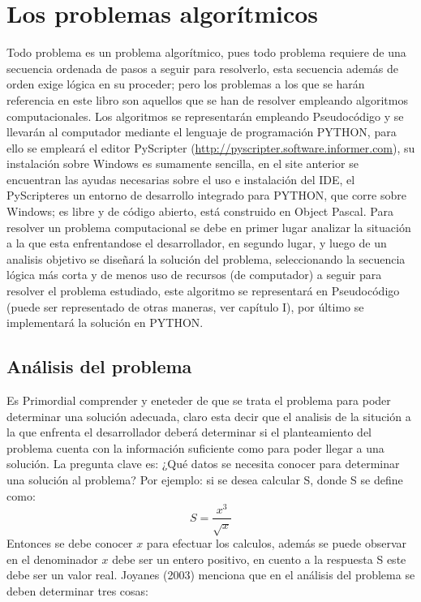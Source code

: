 \documentclass[12pt, a4paper]{article}
\title{\textbf{
	\begin{flushright}
		Capítulo II
	\end{flushright}
	ALGORITMOS Y PROGRMAS ELEMENTALES
	}}
\date{\today}
\author{Las Chicas Superpoderosas}
\begin{document}
\maketitle
\renewcommand{\contentsname}{}
\tableofcontents

\newpage

\section{Los problemas algorítmicos}

Todo problema es un problema algorítmico, pues todo problema requiere de una secuencia ordenada de pasos a seguir para resolverlo, esta secuencia además de orden exige lógica en su proceder; pero los problemas a los que se harán referencia en este libro son aquellos que se han de resolver empleando algoritmos computacionales.
Los algoritmos se representarán empleando Pseudocódigo y se llevarán al computador mediante el lenguaje de programación PYTHON, para ello se empleará el editor PyScripter (\textcolor{blue}{\url{http://pyscripter.software.informer.com}}), su instalación sobre Windows es sumamente sencilla, en el site anterior se encuentran las ayudas necesarias sobre el uso e instalación del IDE, el PyScripteres un entorno de desarrollo integrado para PYTHON, que corre sobre Windows; es libre y de código abierto, está construido en Object Pascal. Para resolver un problema computacional se debe en primer lugar analizar la situación a la que esta enfrentandose el desarrollador, en segundo lugar, y luego de un analisis objetivo se diseñará la solución del problema, seleccionando la secuencia lógica más corta y de menos uso de recursos (de computador) a seguir para resolver el problema estudiado, este algoritmo se representará en Pseudocódigo (puede ser representado de otras maneras, ver capítulo I), por último se implementará la solución en PYTHON.

\subsection{Análisis del problema}
Es Primordial comprender y eneteder de que se trata el problema para poder determinar una solución adecuada, claro esta decir que el analisis de la situción a la que enfrenta el desarrollador deberá determinar si el planteamiento del problema cuenta con la información suficiente como para poder llegar a una solución.
La pregunta clave es: ¿Qué datos se necesita conocer para determinar una solución al problema? Por ejemplo: si se desea calcular S, donde S se define como:
\[
    S = \dfrac{x^3}{\sqrt{x}}
\]
Entonces se debe conocer $x$ para efectuar los calculos, además se puede observar en el denominador $x$ debe ser un entero positivo, en cuento a la respuesta S este debe ser un valor real. Joyanes (2003) menciona que en el análisis del problema se deben determinar tres cosas:
\end{document}
